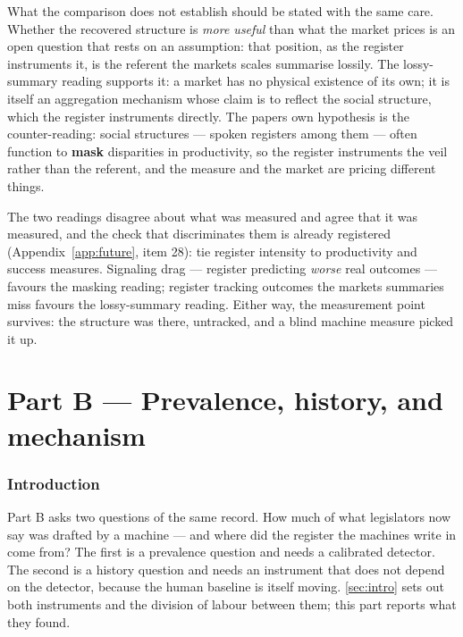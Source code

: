 What the comparison does not establish should be stated with the same
care. Whether the recovered structure is \emph{more useful} than what the market
prices is an open question that rests on an assumption: that position, as the
register instruments it, is the referent the market\textquotesingle s scales summarise
lossily. The lossy-summary reading supports it: a market has no physical
existence of its own; it is itself an aggregation mechanism whose claim is to
reflect the social structure, which the register instruments directly. The
paper\textquotesingle s own hypothesis is the counter-reading: social structures --- spoken
registers among them --- often function to \textbf{mask} disparities in productivity,
so the register instruments the veil rather than the referent, and the measure
and the market are pricing different things.

The two readings disagree about what was measured and agree that it was
measured, and the check that discriminates them is already registered
(Appendix~\ref{app:future}, item 28): tie register intensity to productivity and success
measures. Signaling drag --- register predicting \emph{worse} real outcomes ---
favours the masking reading; register tracking outcomes the market\textquotesingle s
summaries miss favours the lossy-summary reading. Either way, the
measurement point survives: the structure was there, untracked, and a
blind machine measure picked it up.

\part*{Part B --- Prevalence, history, and mechanism}\setcounter{section}{0}

\section{Introduction}\label{sec:b-intro}

Part B asks two questions of the same record. How much of what legislators
now say was drafted by a machine --- and where did the register the machines
write in come from? The first is a prevalence question and needs a calibrated
detector. The second is a history question and needs an instrument that does
not depend on the detector, because the human baseline is itself moving. \cref{sec:intro}
sets out both instruments and the division of labour between them; this part
reports what they found.

